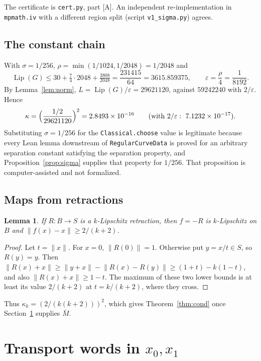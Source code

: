 \documentclass[11pt]{article}
\newtheorem{lemma}[theorem]{Lemma}
\theoremstyle{definition}
\theoremstyle{remark}
\newcommand{\norm}[1]{\lVert #1\rVert}
\newcommand{\Lip}{\operatorname{Lip}}
\begin{document}
The certificate is \texttt{cert.py}, part [A]. An independent re-implementation in
\texttt{mpmath.iv} with a different region split (script \texttt{v1\_sigma.py}) agrees.

\subsection{The constant chain}
With $\sigma=1/256$, $\rho=\min(1/1024,1/2048)=1/2048$ and
\[
 \Lip(G)\le 30+\tfrac74\cdot2048+\tfrac{3808}{2048}=\frac{231415}{64}=3615.859375,
 \qquad \varepsilon=\frac\rho4=\frac1{8192}.
\]
By Lemma~\ref{lem:norm}, $L=\Lip(G)/\varepsilon=29621120$, against $59242240$ with $2/\varepsilon$.
Hence
\[
 \kappa=\Bigl(\frac{1/2}{29621120}\Bigr)^2=2.8493\times10^{-16}
 \qquad(\text{with }2/\varepsilon:\ 7.1232\times10^{-17}).
\]
Substituting $\sigma=1/256$ for the \texttt{Classical.choose} value is legitimate because every
Lean lemma downstream of \texttt{RegularCurveData} is proved for an arbitrary separation constant
satisfying the separation property, and Proposition~\ref{prop:sigma} supplies that property for
$1/256$. That proposition is computer-assisted and not formalized.

\subsection{Maps from retractions}
\begin{lemma}\label{lem:retr}
If $R:B\to S$ is a $k$-Lipschitz retraction, then $f=-R$ is $k$-Lipschitz on $B$ and
$\norm{f(x)-x}\ge 2/(k+2)$.
\end{lemma}
\begin{proof}
Let $t=\norm x$. For $x=0$, $\norm{R(0)}=1$. Otherwise put $y=x/t\in S$, so $R(y)=y$. Then
$\norm{R(x)+x}\ge\norm{y+x}-\norm{R(x)-R(y)}\ge(1+t)-k(1-t)$, and also
$\norm{R(x)+x}\ge1-t$. The maximum of these two lower bounds is at least its value $2/(k+2)$ at
$t=k/(k+2)$, where they cross.
\end{proof}
Thus $\kappa_k=(2/(k(k+2)))^2$, which gives Theorem~\ref{thm:cond} once Section~\ref{sec:words}
supplies $\bar M$.

\section{Transport words in \texorpdfstring{$x_0,x_1$}{x0, x1}}\label{sec:words}
\end{document}
